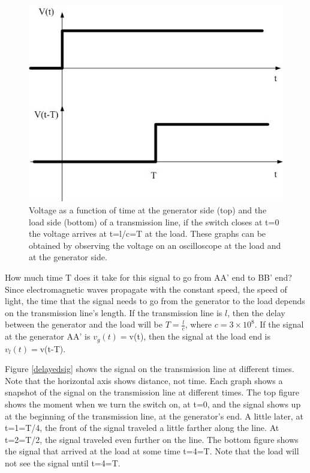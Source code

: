 \documentclass{ximera}
\begin{document}
\begin{figure}[htbp]
\begin{center}
\includegraphics[scale=0.5]{jpg/timedelayedsignal.jpg}  
\end{center}
\caption{Voltage as a function of time at the generator side (top) and the load side (bottom) of a transmission line, if the switch closes at t=0 the voltage arrives at t=l/c=T at the load. These graphs can be obtained by observing the voltage on an oscilloscope at the load and at the generator side.}
\label{timedelaysig} 
 \end{figure}





 How much time T does it take for this signal to go from AA' end to BB' end? 
Since electromagnetic waves propagate with the constant speed, the speed of light,  the time that the signal needs to go from the generator to the load depends on the transmission line's length. If the transmission line is $l$, then the delay between the generator and the load will be  $T=\frac{l}{c}$, where $c=3\times 10^8$. If the signal at the generator AA' is $v_g(t)=$v(t), then the signal at the load end is $v_l(t)=$v(t-T). 


Figure \ref{delayedsig} shows the signal on the transmission line at different times. Note that the horizontal axis shows distance, not time. Each graph shows a snapshot of the signal on the transmission line at different times. The top figure shows the moment when we turn the switch on, at t=0, and the signal shows up at the beginning of the transmission line, at the generator's end. A little later, at t=1=T/4, the front of the signal traveled a little farther along the line. At t=2=T/2, the signal traveled even further on the line. The bottom figure shows the signal that arrived at the load at some time t=4=T. Note that the load will not see the signal until t=4=T. 
\end{document}
